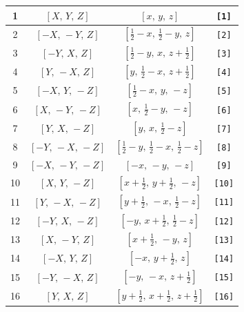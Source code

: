 \documentclass[fleqn,8pt]{jsarticle}
\begin{document}
\begin{longtable}{cccc}
1 & $\left[ X,\, Y,\, Z \right]$ & $\left[ x,\, y,\, z \right]$ & {\tt [1]} \\ \hline
2 & $\left[ - X,\, - Y,\, Z \right]$ & $\left[ \frac{1}{2} - x,\, \frac{1}{2} - y,\, z \right]$ & {\tt [2]} \\ \hline
3 & $\left[ - Y,\, X,\, Z \right]$ & $\left[ \frac{1}{2} - y,\, x,\, z + \frac{1}{2} \right]$ & {\tt [3]} \\ \hline
4 & $\left[ Y,\, - X,\, Z \right]$ & $\left[ y,\, \frac{1}{2} - x,\, z + \frac{1}{2} \right]$ & {\tt [4]} \\ \hline
5 & $\left[ - X,\, Y,\, - Z \right]$ & $\left[ \frac{1}{2} - x,\, y,\, - z \right]$ & {\tt [5]} \\ \hline
6 & $\left[ X,\, - Y,\, - Z \right]$ & $\left[ x,\, \frac{1}{2} - y,\, - z \right]$ & {\tt [6]} \\ \hline
7 & $\left[ Y,\, X,\, - Z \right]$ & $\left[ y,\, x,\, \frac{1}{2} - z \right]$ & {\tt [7]} \\ \hline
8 & $\left[ - Y,\, - X,\, - Z \right]$ & $\left[ \frac{1}{2} - y,\, \frac{1}{2} - x,\, \frac{1}{2} - z \right]$ & {\tt [8]} \\ \hline
9 & $\left[ - X,\, - Y,\, - Z \right]$ & $\left[ - x,\, - y,\, - z \right]$ & {\tt [9]} \\ \hline
10 & $\left[ X,\, Y,\, - Z \right]$ & $\left[ x + \frac{1}{2},\, y + \frac{1}{2},\, - z \right]$ & {\tt [10]} \\ \hline
11 & $\left[ Y,\, - X,\, - Z \right]$ & $\left[ y + \frac{1}{2},\, - x,\, \frac{1}{2} - z \right]$ & {\tt [11]} \\ \hline
12 & $\left[ - Y,\, X,\, - Z \right]$ & $\left[ - y,\, x + \frac{1}{2},\, \frac{1}{2} - z \right]$ & {\tt [12]} \\ \hline
13 & $\left[ X,\, - Y,\, Z \right]$ & $\left[ x + \frac{1}{2},\, - y,\, z \right]$ & {\tt [13]} \\ \hline
14 & $\left[ - X,\, Y,\, Z \right]$ & $\left[ - x,\, y + \frac{1}{2},\, z \right]$ & {\tt [14]} \\ \hline
15 & $\left[ - Y,\, - X,\, Z \right]$ & $\left[ - y,\, - x,\, z + \frac{1}{2} \right]$ & {\tt [15]} \\ \hline
16 & $\left[ Y,\, X,\, Z \right]$ & $\left[ y + \frac{1}{2},\, x + \frac{1}{2},\, z + \frac{1}{2} \right]$ & {\tt [16]} \\
\end{longtable}
\end{document}
